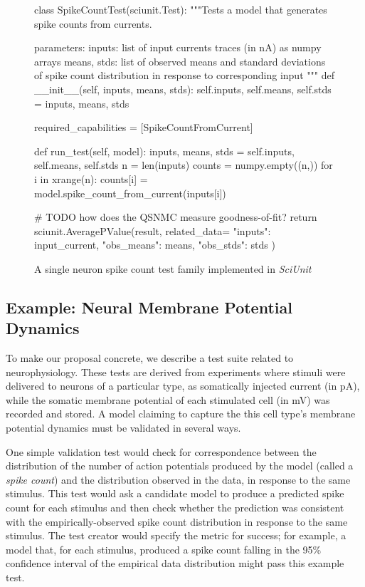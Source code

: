 \documentclass[11pt,letterpaper]{article}
\begin{document}
\begin{figure}
\small
\begin{python}
class SpikeCountTest(sciunit.Test):
  """Tests a model that generates spike counts from currents.

  parameters:
    inputs: list of input currents traces (in nA) as numpy arrays
    means, stds: list of observed means and standard deviations of 
      spike count distribution in response to corresponding input
  """
  def __init__(self, inputs, means, stds):
    self.inputs, self.means, self.stds = inputs, means, stds
	
  required_capabilities = [SpikeCountFromCurrent]
	
  def run_test(self, model):
    inputs, means, stds = self.inputs, self.means, self.stds
    n = len(inputs)
    counts = numpy.empty((n,))
    for i in xrange(n):
      counts[i] = model.spike_count_from_current(inputs[i])
      
    # TODO how does the QSNMC measure goodness-of-fit?
    return sciunit.AveragePValue(result, related_data={
      "inputs": input_current,
      "obs_means": means,
      "obs_stds": stds
    })
\end{python}
\vspace{-5px}
\caption{A single neuron spike count test family implemented in \textit{SciUnit}}
\label{fig:rate_test}
\vspace{-10px}
\end{figure}
\subsection{Example: Neural Membrane Potential Dynamics} To make our proposal concrete, we describe a test suite related to neurophysiology. These tests are derived from experiments where stimuli were delivered to neurons of a particular type, as somatically injected current (in pA), while the somatic membrane potential of each stimulated cell (in mV) was recorded and stored.  A model claiming to capture the this cell type's membrane potential dynamics must be validated in several ways. 

One simple validation test would check for correspondence between the distribution of the number of action potentials produced by the model (called a \emph{spike count}) and the distribution observed in the data, in response to the same stimulus. This test would ask a candidate model to produce a predicted spike count for each stimulus and then check whether the prediction was consistent with the empirically-observed spike count distribution in response to the same stimulus.  The test creator would specify the metric for success; for example, a model that, for each stimulus, produced a spike count falling in the 95\% confidence interval of the empirical data distribution might pass this example test. 
\end{document}

